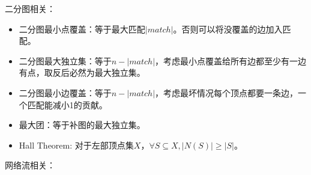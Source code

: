 二分图相关：
\begin{itemize}
    \item 二分图最小点覆盖：等于最大匹配$|match|$。否则可以将没覆盖的边加入匹配。
    \item 二分图最大独立集：等于$n-|match|$，考虑最小点覆盖给所有边都至少有一边有点，取反后必然为最大独立集。
    \item 二分图最小边覆盖：等于$n-|match|$，考虑最坏情况每个顶点都要一条边，一个匹配能减小1的贡献。
    \item 最大团：等于补图的最大独立集。
    \item Hall Theorem: 对于左部顶点集$X$，$\forall S\subseteq X, |N(S)|\ge |S|$。
\end{itemize}

网络流相关：

